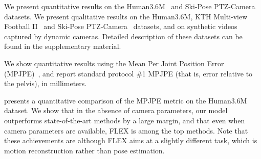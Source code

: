  \label{sec:experiments}


We present quantitative results on the Human3.6M~\cite{h36m_pami,IonescuSminchisescu11} and Ski-Pose PTZ-Camera~\cite{ski_ptz} datasets. We present qualitative results on the Human3.6M,  KTH Multi-view Football II~\cite{footballDS} and Ski-Pose PTZ-Camera~\cite{ski_ptz} datasets,
and on synthetic 
videos captured by dynamic cameras. Detailed description of these datasets can be found in the supplementary material.




We show quantitative results using the Mean Per Joint Position Error (MPJPE)~\cite{h36m_pami,IonescuSminchisescu11}, 
and report standard protocol \#1 MPJPE (that is, error relative to the pelvis), in millimeters.

 presents a quantitative comparison of the MPJPE metric on the Human3.6M~\cite{h36m_pami} dataset. 
We show that in the absence of camera parameters, our model outperforms state-of-the-art methods by a large margin, and that even when camera parameters are available, 
FLEX is among the top methods. Note that these achievements are although FLEX aims at a slightly different task, which is motion reconstruction rather than pose estimation.

